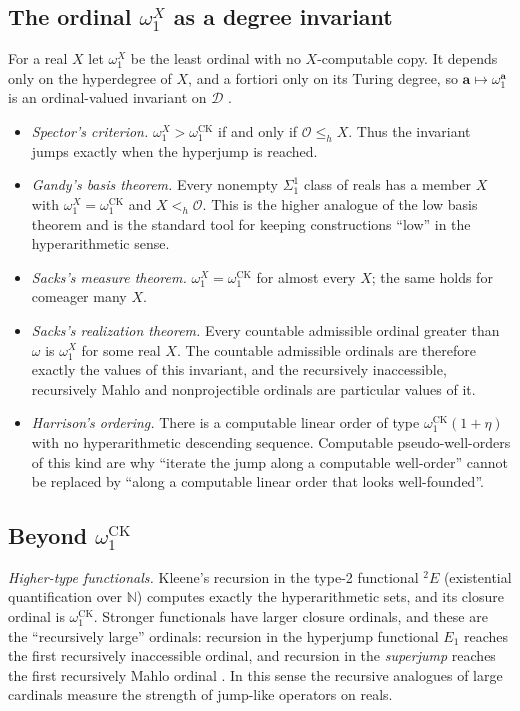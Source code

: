 \documentclass[11pt,a4paper]{article}
\newcommand{\N}{\mathbb N}
\newcommand{\D}{\mathcal D}
\newcommand{\adeg}{\mathbf a}\newcommand{\bdeg}{\mathbf b}
\theoremstyle{definition}\newtheorem{definition}[theorem]{Definition}
\theoremstyle{remark}\newtheorem{remark}[theorem]{Remark}
\begin{document}
\subsection{The ordinal \texorpdfstring{$\omega_1^X$}{omega-1-X} as a degree invariant}
\label{sec:ordinals-omega1}
For a real $X$ let $\omega_1^X$ be the least ordinal with no $X$-computable copy. It depends only on the hyperdegree of $X$, and a fortiori only on its Turing degree, so $\adeg\mapsto\omega_1^{\adeg}$ is an ordinal-valued invariant on $\D$ \cite{SacksHRT}.
\begin{itemize}
\item \emph{Spector's criterion.} $\omega_1^X>\omega_1^{\mathrm{CK}}$ if and only if $\mathcal O\le_h X$. Thus the invariant jumps exactly when the hyperjump is reached.
\item \emph{Gandy's basis theorem.} Every nonempty $\Sigma^1_1$ class of reals has a member $X$ with $\omega_1^X=\omega_1^{\mathrm{CK}}$ and $X<_h\mathcal O$. This is the higher analogue of the low basis theorem and is the standard tool for keeping constructions ``low'' in the hyperarithmetic sense.
\item \emph{Sacks's measure theorem.} $\omega_1^X=\omega_1^{\mathrm{CK}}$ for almost every $X$; the same holds for comeager many $X$.
\item \emph{Sacks's realization theorem.} Every countable admissible ordinal greater than $\omega$ is $\omega_1^X$ for some real $X$. The countable admissible ordinals are therefore exactly the values of this invariant, and the recursively inaccessible, recursively Mahlo and nonprojectible ordinals are particular values of it.
\item \emph{Harrison's ordering.} There is a computable linear order of type $\omega_1^{\mathrm{CK}}(1+\eta)$ with no hyperarithmetic descending sequence. Computable pseudo-well-orders of this kind are why ``iterate the jump along a computable well-order'' cannot be replaced by ``along a computable linear order that looks well-founded''.
\end{itemize}

\subsection{Beyond \texorpdfstring{$\omega_1^{\mathrm{CK}}$}{the Church--Kleene ordinal}}
\label{sec:ordinals-beyond}
\emph{Higher-type functionals.} Kleene's recursion in the type-2 functional ${}^2E$ (existential quantification over $\N$) computes exactly the hyperarithmetic sets, and its closure ordinal is $\omega_1^{\mathrm{CK}}$. Stronger functionals have larger closure ordinals, and these are the ``recursively large'' ordinals: recursion in the hyperjump functional $E_1$ reaches the first recursively inaccessible ordinal, and recursion in the \emph{superjump} reaches the first recursively Mahlo ordinal \cite{AczelHinman,HarringtonMahlo,Hinman}. In this sense the recursive analogues of large cardinals measure the strength of jump-like operators on reals.
\end{document}
